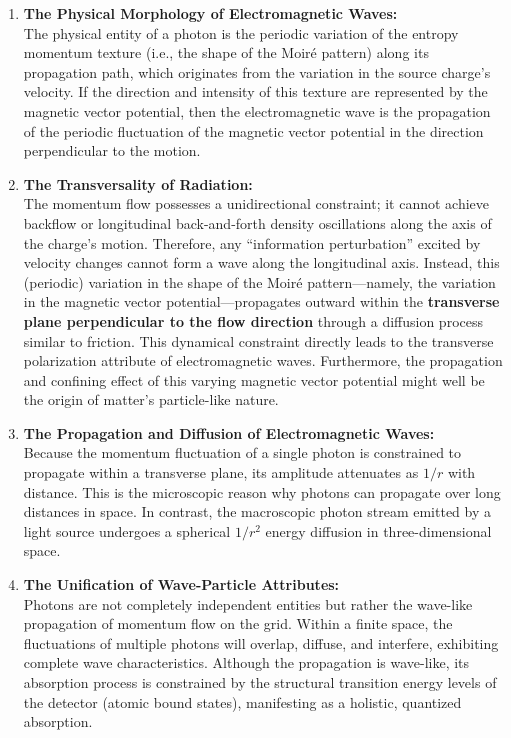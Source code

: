 \documentclass[12pt, a4paper]{article}
\begin{document}
\begin{enumerate}
    \item \textbf{The Physical Morphology of Electromagnetic Waves:}\\
    The physical entity of a photon is the periodic variation of the entropy momentum texture (i.e., the shape of the Moiré pattern) along its propagation path, which originates from the variation in the source charge's velocity. If the direction and intensity of this texture are represented by the magnetic vector potential, then the electromagnetic wave is the propagation of the periodic fluctuation of the magnetic vector potential in the direction perpendicular to the motion.

    \item \textbf{The Transversality of Radiation:}\\
    The momentum flow possesses a unidirectional constraint; it cannot achieve backflow or longitudinal back-and-forth density oscillations along the axis of the charge's motion. Therefore, any ``information perturbation'' excited by velocity changes cannot form a wave along the longitudinal axis. Instead, this (periodic) variation in the shape of the Moiré pattern---namely, the variation in the magnetic vector potential---propagates outward within the \textbf{transverse plane perpendicular to the flow direction} through a diffusion process similar to friction. This dynamical constraint directly leads to the transverse polarization attribute of electromagnetic waves. Furthermore, the propagation and confining effect of this varying magnetic vector potential might well be the origin of matter's particle-like nature.

    \item \textbf{The Propagation and Diffusion of Electromagnetic Waves:}\\
    Because the momentum fluctuation of a single photon is constrained to propagate within a transverse plane, its amplitude attenuates as $1/r$ with distance. This is the microscopic reason why photons can propagate over long distances in space. In contrast, the macroscopic photon stream emitted by a light source undergoes a spherical $1/r^2$ energy diffusion in three-dimensional space.

    \item \textbf{The Unification of Wave-Particle Attributes:}\\
    Photons are not completely independent entities but rather the wave-like propagation of momentum flow on the grid. Within a finite space, the fluctuations of multiple photons will overlap, diffuse, and interfere, exhibiting complete wave characteristics. Although the propagation is wave-like, its absorption process is constrained by the structural transition energy levels of the detector (atomic bound states), manifesting as a holistic, quantized absorption.
\end{enumerate}
\end{document}

